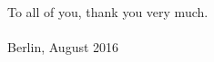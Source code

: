 \documentclass[11pt, english, singlespacing, headsepline, ]{MastersDoctoralThesis}
\theoremstyle{definition}
\begin{document}
To all of you, thank you very much.
\\
\\

Berlin, August 2016 



\pagestyle{empty} 
\tableofcontents%













\mainmatter %

\pagestyle{thesis} %



\end{document}
